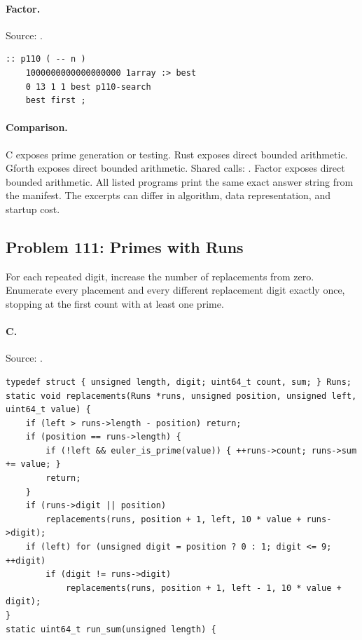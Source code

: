 \paragraph{Factor.} Source: .
\begin{lstlisting}
:: p110 ( -- n )
    1000000000000000000 1array :> best
    0 13 1 1 best p110-search
    best first ;
\end{lstlisting}

\paragraph{Comparison.}
C exposes prime generation or testing. Rust exposes direct bounded arithmetic. Gforth exposes direct bounded arithmetic. Shared calls: \texttt{}. Factor exposes direct bounded arithmetic.
All listed programs print the same exact answer string from the manifest. The excerpts can differ in algorithm, data representation, and startup cost.

\subsection{Problem 111: Primes with Runs}
\label{walkthrough:p111}
For each repeated digit, increase the number of replacements from zero. Enumerate every placement and every different replacement digit exactly once, stopping at the first count with at least one prime.

\paragraph{C.} Source: .
\begin{lstlisting}
typedef struct { unsigned length, digit; uint64_t count, sum; } Runs;
static void replacements(Runs *runs, unsigned position, unsigned left, uint64_t value) {
    if (left > runs->length - position) return;
    if (position == runs->length) {
        if (!left && euler_is_prime(value)) { ++runs->count; runs->sum += value; }
        return;
    }
    if (runs->digit || position)
        replacements(runs, position + 1, left, 10 * value + runs->digit);
    if (left) for (unsigned digit = position ? 0 : 1; digit <= 9; ++digit)
        if (digit != runs->digit)
            replacements(runs, position + 1, left - 1, 10 * value + digit);
}
static uint64_t run_sum(unsigned length) {
\end{lstlisting}

